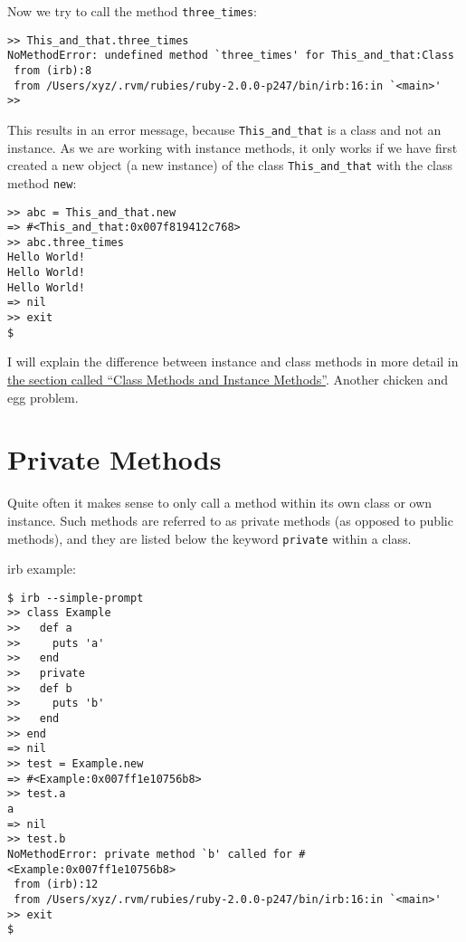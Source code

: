 \documentclass[a4paper]{book}
\begin{document}
Now we try to call the method \texttt{three\_times}:

\begin{shaded}\begin{verbatim}
>> This_and_that.three_times
NoMethodError: undefined method `three_times' for This_and_that:Class
 from (irb):8
 from /Users/xyz/.rvm/rubies/ruby-2.0.0-p247/bin/irb:16:in `<main>'
>>
\end{verbatim}\end{shaded}

This results in an error message, because \texttt{This\_and\_that} is a class and not an instance. As we are working with instance methods, it only works if we have first created a new object (a new instance) of the class \texttt{This\_and\_that} with the class method \texttt{new}:

\begin{shaded}\begin{verbatim}
>> abc = This_and_that.new
=> #<This_and_that:0x007f819412c768>
>> abc.three_times
Hello World!
Hello World!
Hello World!
=> nil
>> exit
$
\end{verbatim}\end{shaded}

I will explain the difference between instance and class methods in more detail in \hyperref[classux5fmethodsux5fvsux5finstanceux5fmethods]{the section called “Class Methods and Instance Methods”}. Another chicken and egg problem.

\section{Private Methods}\label{private-methods}

Quite often it makes sense to only call a method within its own class or own instance. Such methods are referred to as private methods (as opposed to public methods), and they are listed below the keyword \texttt{private} within a class.

irb example:

\begin{shaded}\begin{verbatim}
$ irb --simple-prompt
>> class Example
>>   def a
>>     puts 'a'
>>   end
>>   private
>>   def b
>>     puts 'b'
>>   end
>> end
=> nil
>> test = Example.new
=> #<Example:0x007ff1e10756b8>
>> test.a
a
=> nil
>> test.b
NoMethodError: private method `b' called for #<Example:0x007ff1e10756b8>
 from (irb):12
 from /Users/xyz/.rvm/rubies/ruby-2.0.0-p247/bin/irb:16:in `<main>'
>> exit
$
\end{verbatim}\end{shaded}
\end{document}
